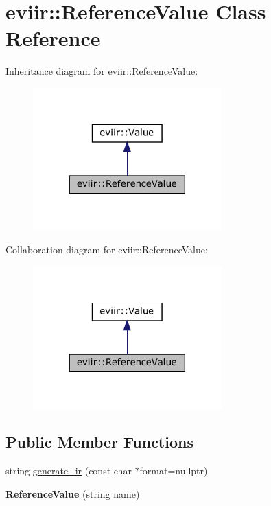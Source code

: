 \hypertarget{classeviir_1_1ReferenceValue}{}\section{eviir\+:\+:Reference\+Value Class Reference}
\label{classeviir_1_1ReferenceValue}


Inheritance diagram for eviir\+:\+:Reference\+Value\+:\nopagebreak
\begin{figure}[H]
\begin{center}
\leavevmode
\includegraphics[width=206pt]{classeviir_1_1ReferenceValue__inherit__graph}
\end{center}
\end{figure}


Collaboration diagram for eviir\+:\+:Reference\+Value\+:\nopagebreak
\begin{figure}[H]
\begin{center}
\leavevmode
\includegraphics[width=206pt]{classeviir_1_1ReferenceValue__coll__graph}
\end{center}
\end{figure}
\subsection*{Public Member Functions}
\begin{DoxyCompactItemize}
\item 
string \hyperlink{classeviir_1_1ReferenceValue_a7b03ad70c7253d44fb7061a91751f9f6}{generate\+\_\+ir} (const char $\ast$format=nullptr)
\item 
\mbox{\label{classeviir_1_1ReferenceValue_ae001aa4a016ccf2a16cd6c0a864a9c20}} 
{\bfseries Reference\+Value} (string name)
\end{DoxyCompactItemize}
